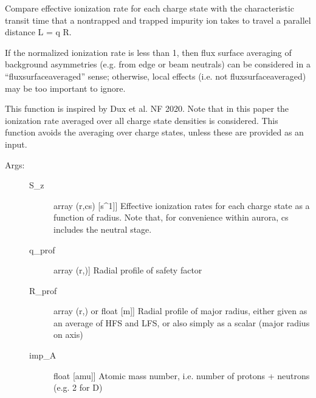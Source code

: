 \documentclass[letterpaper,10pt,english]{sphinxmanual}
\begin{document}
\begin{fulllineitems}
\label{\detokenize{aurora:aurora.atomic.plot_norm_ion_freq}}
Compare effective ionization rate for each charge state with the 
characteristic transit time that a non\sphinxhyphen{}trapped and trapped impurity ion takes
to travel a parallel distance L = q R.

If the normalized ionization rate is less than 1, then flux surface averaging of
background asymmetries (e.g. from edge or beam neutrals) can be considered in a 
“flux\sphinxhyphen{}surface\sphinxhyphen{}averaged” sense; otherwise, local effects (i.e. not flux\sphinxhyphen{}surface\sphinxhyphen{}averaged)
may be too important to ignore.

This function is inspired by Dux et al. NF 2020. Note that in this paper the ionization 
rate averaged over all charge state densities is considered. This function avoids the 
averaging over charge states, unless these are provided as an input.
\begin{description}
\item[{Args:}] \leavevmode\begin{description}
\item[{S\_z}] \leavevmode{[}array (r,cs) {[}s\textasciicircum{}\sphinxhyphen{}1{]}{]}
Effective ionization rates for each charge state as a function of radius. 
Note that, for convenience within aurora, cs includes the neutral stage.

\item[{q\_prof}] \leavevmode{[}array (r,){]}
Radial profile of safety factor

\item[{R\_prof}] \leavevmode{[}array (r,) or float {[}m{]}{]}
Radial profile of major radius, either given as an average of HFS and LFS, or also
simply as a scalar (major radius on axis)

\item[{imp\_A}] \leavevmode{[}float {[}amu{]}{]}
Atomic mass number, i.e. number of protons + neutrons (e.g. 2 for D)


\end{description}
\end{description}
\end{fulllineitems}
\end{document}
